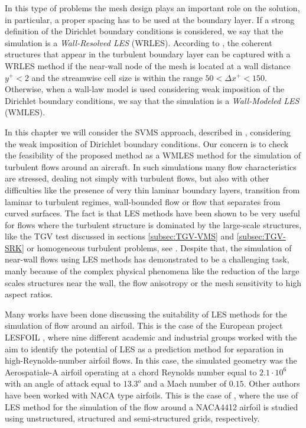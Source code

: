 In this type of problems the mesh design plays an important role on the solution, in particular, a proper spacing has to be used at the boundary layer. If a strong definition of the Dirichlet boundary conditions is considered, we say that the simulation is a \textit{Wall-Resolved LES} (WRLES). According to \cite{piomelli_large-eddy_1996}, the coherent structures that appear in the turbulent boundary layer can be captured with a WRLES method if the near-wall node of the mesh is located at a wall distance $y^+<2$ and the streamwise cell size is within the range $50<\Delta x^+<150$. Otherwise, when a wall-law model is used considering weak imposition of the Dirichlet boundary conditions, we say that the simulation is a \textit{Wall-Modeled LES} (WMLES).

In this chapter we will consider the SVMS approach, described in , considering the weak imposition of Dirichlet boundary conditions. Our concern is to check the feasibility of the proposed method as a WMLES method for the simulation of turbulent flows around an aircraft. In such simulations many flow characteristics are stressed, dealing not simply with turbulent flows, but also with other difficulties like the presence of very thin laminar boundary layers, transition from laminar to turbulent regimes, wall-bounded flow or flow that separates from curved surfaces. The fact is that LES methods have been shown to be very useful for flows where the turbulent structure is dominated by the large-scale structures, like the TGV test discussed in sections \ref{subsec:TGV-VMS} and \ref{subsec:TGV-SRK} or homogeneous turbulent problems, see \cite{colomes_2014}. Despite that, the simulation of near-wall flows using LES methods has demonstrated to be a challenging task, manly because of the complex physical phenomena like the reduction of the large scales structures near the wall, the flow anisotropy or the mesh sensitivity to high aspect ratios. 

Many works have been done discussing the suitability of LES methods for the simulation of flow around an airfoil. This is the case of the European project LESFOIL \cite{davidson_lesfoil:_2003}, where nine different academic and industrial groups worked with the aim to identify the potential of LES as a prediction method for separation in high-Reynolds-number airfoil flows. In this case, the simulated geometry was the Aerospatiale-A airfoil operating at a chord Reynolds number equal to $2.1\cdot10^6$ with an angle of attack equal to $13.3^o$ and a Mach number of $0.15$. Other authors have been worked with NACA type airfoils. This is the case of \cite{jansen_stabilized_1999, kaltenbach_large-eddy_1995, schmidt_assessment_????}, where the use of LES method for the simulation of the flow around a NACA4412 airfoil is studied using unstructured, structured and semi-structured grids, respectively.

